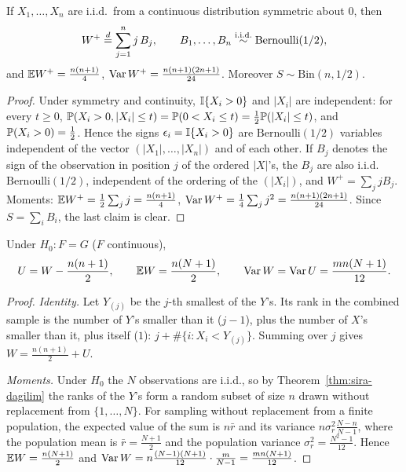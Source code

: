\documentclass[main.tex]{subfiles}
\begin{document}
\begin{theorem}\label{thm:wilcoxon-isaretli}
If $X_1,\dots,X_n$ are i.i.d.\ from a continuous distribution symmetric about $0$, then
\[
W^+\overset{d}{=}\sum_{j=1}^n j\,B_j,\qquad B_1,\dots,B_n\iid\text{Bernoulli}(1/2),
\]
and $\E W^+=\frac{n(n+1)}4$, $\Var W^+=\frac{n(n+1)(2n+1)}{24}$. Moreover $S\sim\text{Bin}(n,1/2)$.
\end{theorem}
\begin{proof}
Under symmetry and continuity, $\I\{X_i>0\}$ and $|X_i|$ are independent: for every $t\ge0$, $\P(X_i>0,|X_i|\le t)=\P(0<X_i\le t)=\frac12\P(|X_i|\le t)$, and $\P(X_i>0)=\frac12$. Hence the signs $\epsilon_i=\I\{X_i>0\}$ are $\text{Bernoulli}(1/2)$ variables independent of the vector $(|X_1|,\dots,|X_n|)$ and of each other. If $B_j$ denotes the sign of the observation in position $j$ of the ordered $|X|$'s, the $B_j$ are also i.i.d.\ $\text{Bernoulli}(1/2)$, independent of the ordering of the $(|X_i|)$, and $W^+=\sum_jjB_j$. Moments: $\E W^+=\frac12\sum_jj=\frac{n(n+1)}4$, $\Var W^+=\frac14\sum_jj^2=\frac{n(n+1)(2n+1)}{24}$. Since $S=\sum_iB_i$, the last claim is clear.
\end{proof}

\begin{theorem}\label{thm:mann-whitney}
Under $H_0:F=G$ ($F$ continuous),
\[
U=W-\frac{n(n+1)}2,\qquad\E W=\frac{n(N+1)}2,\qquad\Var W=\Var U=\frac{mn(N+1)}{12}.
\]
\end{theorem}
\begin{proof}
\emph{Identity.} Let $Y_{(j)}$ be the $j$-th smallest of the $Y$'s. Its rank in the combined sample is the number of $Y$'s smaller than it ($j-1$), plus the number of $X$'s smaller than it, plus itself ($1$): $j+\#\{i:X_i<Y_{(j)}\}$. Summing over $j$ gives $W=\frac{n(n+1)}2+U$.

\emph{Moments.} Under $H_0$ the $N$ observations are i.i.d., so by Theorem~\ref{thm:sira-dagilim} the ranks of the $Y$'s form a random subset of size $n$ drawn without replacement from $\{1,\dots,N\}$. For sampling without replacement from a finite population, the expected value of the sum is $n\bar r$ and its variance $n\sigma_r^2\frac{N-n}{N-1}$, where the population mean is $\bar r=\frac{N+1}2$ and the population variance $\sigma_r^2=\frac{N^2-1}{12}$. Hence $\E W=\frac{n(N+1)}2$ and $\Var W=n\frac{(N-1)(N+1)}{12}\cdot\frac{m}{N-1}=\frac{mn(N+1)}{12}$.
\end{proof}
\end{document}
